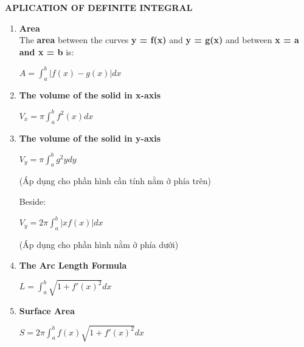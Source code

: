 \documentclass[10pt]{article}
\begin{document}
\pagebreak
\begin{center}
\textbf{APLICATION OF DEFINITE INTEGRAL}
\end{center}
\begin{enumerate}
	\item \textbf{Area}\\
	The \textbf{area} between the curves \textbf{y = f(x)} and \textbf{y = g(x)} and between \textbf{x = a and x = b} is:
	\begin{mybox}
	\begin{center}
	$A = \displaystyle \int_{a}^{b} |f(x) - g(x)|dx$
	\end{center}
	\end{mybox}
	\item \textbf{The volume of the solid in x-axis}
	\begin{mybox}
	\begin{center}
	$V_x = \pi \displaystyle \int_{a}^{b}f^2(x)dx$
	\end{center}
	\end{mybox}
	\item \textbf{The volume of the solid in y-axis}
	\begin{mybox}
	\begin{center}
	$V_y = \pi \displaystyle \int_{a}^{b}g^2ydy$
	\end{center}
	\end{mybox}
	\begin{center}
	(Áp dụng cho phần hình cần tính nằm ở phía trên)
	\end{center}
	Beside:
	\begin{mybox}
	\begin{center}
	$V_y = 2 \pi \displaystyle \int_{a}^{b} |xf(x)|dx$
	\end{center}
	\end{mybox}
	\begin{center}
	(Áp dụng cho phần hình nằm ở phía dưới)
	\end{center}
	\item \textbf{The Arc Length Formula}
	\begin{mybox}
	\begin{center}
	$L = \displaystyle \int_{a}^{b} \sqrt{1 + f'(x)^2}dx$
	\end{center}
	\end{mybox}
	\item \textbf{Surface Area}
	\begin{mybox}
	\begin{center}
	$S = 2 \pi \displaystyle \int_{a}^{b} f(x) \sqrt{1 + f'(x)^2}dx$
	\end{center}
	\end{mybox}
\end{enumerate}
\end{document}
